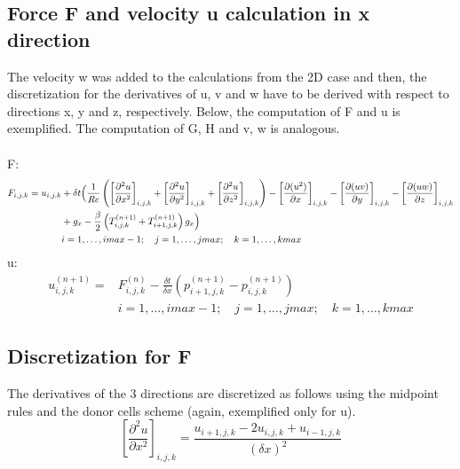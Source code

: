 \documentclass{article}%
\begin{document}
\subsection{Force F and velocity u calculation in x direction}
The velocity w was added to the calculations from the 2D case and then, the discretization for the derivatives of u, v and w have to be derived with respect to directions x, y and z, respectively. Below, the computation of F and u is exemplified. The computation of G, H and v, w is analogous. \\
\\
F:
\begin{equation}
\begin{split}
F_{i,j,k} =
u_{i,j,k} & + \delta t \Bigl(
\frac{1}{Re} \left( \left[\frac{\partial^2 u}{\partial x^2}\right]_{i,j,k} + \left[\frac{\partial^2 u}{\partial y^2}\right]_{i,j,k} + \left[\frac{\partial^2 u}{\partial z^2}\right]_{i,j,k} \right) - 
\left[\frac{\partial(u^2)}{\partial x}\right]_{i,j,k} -\left[\frac{\partial (uv)}{\partial y}\right]_{i,j,k} - 
\left[\frac{\partial (uw)}{\partial z}\right]_{i,j,k}\\
& + {g_x} - \frac{\beta}{2} \left( T^{(n+1)}_{i,j,k} + T^{(n+1)}_{i+1,j,k} \right) g_x \Bigr)\\
& i = 1,\ldots,imax-1; \quad j = 1,\ldots,jmax; \quad k = 1,\ldots,kmax
\end{split}
\end{equation}
u:\\
\begin{equation}
\begin{split}
u^{(n+1)}_{i,j,k} = & F^{(n)}_{i,j,k} - \frac{\delta t}{\delta x}\left(p^{(n+1)}_{i+1,j,k} - p^{(n+1)}_{i,j,k}\right)\\
& i = 1,\ldots,imax-1; \quad j = 1,\ldots,jmax; \quad k = 1,\ldots,kmax
\end{split}
\end{equation}

\subsection{Discretization for F}
The derivatives of the 3 directions are discretized as follows using the midpoint rules and the donor cells scheme (again, exemplified only for u).\\
\begin{equation}
\left[\frac{\partial^2 u}{\partial x^2}\right]_{i,j,k} =
\frac{u_{i+1,j,k} - 2u_{i,j,k} + u_{i-1,j,k}}{(\delta x)^2}
\end{equation}
\end{document}

